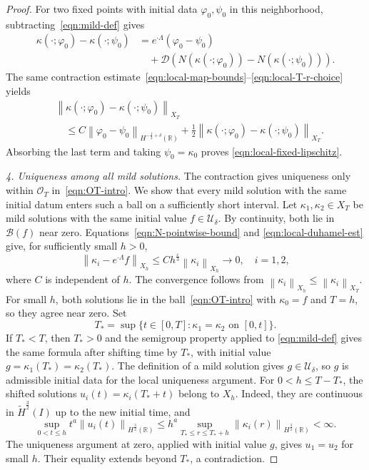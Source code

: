 \documentclass[10pt,a4paper]{amsart}
\newcommand{\R}{\mathbb{R}}
\newcommand{\hr}[1]{H^{#1}(\R)}
\newcommand{\mc}[1]{\mathcal{#1}}
\newcommand{\norm}[1]{\left\lVert #1 \right\rVert}
\newcommand{\paren}[1]{\left(#1\right)}
\newcommand{\thi}[1]{\wt H^{#1}(I)}
\newcommand{\vph}{\varphi}
\newcommand{\wt}[1]{\widetilde{#1}}
\begin{document}
\begin{proof}
For two fixed points with initial data $\vph_0,\psi_0$ in this neighborhood,
subtracting~\eqref{eqn:mild-def} gives
\begin{equation*}
\begin{aligned}
    \kappa(\cdot;\vph_0)-\kappa(\cdot;\psi_0)
    &=e^{\cdot\Lambda}(\vph_0-\psi_0)\\
    &\quad+\mc D\paren{N(\kappa(\cdot;\vph_0))-N(\kappa(\cdot;\psi_0))}.
\end{aligned}
\end{equation*}
The same contraction estimate~\eqref{eqn:local-map-bounds}--\eqref{eqn:local-T-r-choice} yields
\begin{equation}
\begin{aligned}
    &\norm{\kappa(\cdot;\vph_0)-\kappa(\cdot;\psi_0)}_{X_T}\\
    &\quad\le C\norm{\vph_0-\psi_0}_{\hr{-\frac12+\delta}}
    +\frac12
    \norm{\kappa(\cdot;\vph_0)-\kappa(\cdot;\psi_0)}_{X_T}.
\end{aligned}
\end{equation}
Absorbing the last term and taking $\psi_0=\kappa_0$ proves
\eqref{eqn:local-fixed-lipschitz}.

\emph{4. Uniqueness among all mild solutions.}
The contraction gives uniqueness only within $\mc O_T$
in~\eqref{eqn:OT-intro}. We show that every mild solution with the same
initial datum enters such a ball on a sufficiently short interval.
Let $\kappa_1,\kappa_2\in X_T$ be mild solutions with the same initial
value $f\in\mc U_\delta$. By continuity, both lie in
$\mc B(f)$ near zero.
Equations~\eqref{eqn:N-pointwise-bound} and
\eqref{eqn:local-duhamel-est} give, for sufficiently small $h>0$,
\begin{equation}
    \norm{\kappa_i-e^{\cdot\Lambda}f}_{X_h}
    \le C h^{\frac{\varepsilon}{3}}\norm{\kappa_i}_{X_h}
    \longrightarrow0,
    \quad i=1,2,
\end{equation}
where $C$ is independent of $h$. The convergence follows from
$\norm{\kappa_i}_{X_h}\le\norm{\kappa_i}_{X_T}$. For small $h$, both
solutions lie in the ball~\eqref{eqn:OT-intro} with $\kappa_0=f$ and $T=h$, so they
agree near zero. Set
\begin{equation*}
    T_*=\sup\{t\in[0,T]:\kappa_1=\kappa_2\text{ on }[0,t]\}.
\end{equation*}
If $T_*<T$, then $T_*>0$ and the semigroup property applied to
\eqref{eqn:mild-def} gives the same formula after shifting time by $T_*$,
with initial value
$g=\kappa_1(T_*)=\kappa_2(T_*)$.
The definition of a mild solution gives $g\in\mc U_\delta$, so $g$
is admissible initial data for the local uniqueness argument.
For $0<h\le T-T_*$, the shifted
solutions $u_i(t)=\kappa_i(T_*+t)$ belong to $X_h$. Indeed, they are
continuous in $\thi{\frac32}$ up to the new initial time, and
\begin{equation*}
    \sup_{0<t\le h}t^a\norm{u_i(t)}_{\hr{\frac32}}
    \le h^a\sup_{T_*\le r\le T_*+h}\norm{\kappa_i(r)}_{\hr{\frac32}}
    <\infty.
\end{equation*}
The uniqueness argument at zero, applied with initial value $g$,
gives $u_1=u_2$ for small $h$. Their equality extends beyond
$T_*$, a contradiction.
\end{proof}
\end{document}
